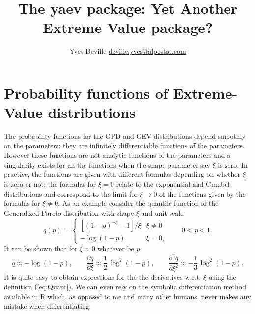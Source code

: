 \documentclass[11pt]{article}\usepackage[]{graphicx}\usepackage[]{xcolor}
\title{\bf \Large The \textbf{yaev} package: Yet Another Extreme Value package?}
\author{Yves Deville \href{mailto:deville.yves@alpestat.com}%
  {deville.yves@alpestat.com} }
\begin{document}
\maketitle{}
\tableofcontents{}

\section{Probability functions of Extreme-Value distributions}
  
The probability functions for the GPD and GEV distributions depend
smoothly on the parameters: they are infinitely differentiable
functions of the parameters. However these functions are not analytic
functions of the parameters and a singularity exists for all the
functions when the shape parameter say $\xi$ is zero.  In practice,
the functions are given with different formulas depending on whether
$\xi$ is zero or not; the formulas for $\xi = 0$ relate to the
exponential and Gumbel distributions and correspond to the limit for
$\xi \to 0$ of the functions given by the formulas for $\xi \neq 0$.
As an example consider the quantile function of the Generalized Pareto
distribution with shape $\xi$ and unit scale
\begin{equation}
\label{eq:Quant}
q(p) = \begin{cases}
  [(1 - p)^{-\xi} - 1] / \xi & \xi \neq 0 \\
  -\log(1 - p) & \xi = 0,
\end{cases} \qquad 0 < p < 1.
\end{equation}
It can be shown that for $\xi \approx 0$ whatever be $p$
$$
q \approx - \log(1-p), \qquad
\frac{\partial q}{\partial \xi} \approx \frac{1}{2}\, \log^2(1-p), \qquad
\frac{\partial^2 q}{\partial \xi^2} \approx -\frac{1}{3}\, \log^2(1-p).
$$
It is quite easy to obtain expressions for the the derivatives
w.r.t. $\xi$ using the definition (\ref{eq:Quant}). We can even rely
on the symbolic differentiation method \verb@D@ available in R which,
as opposed to me and many other humans, never makes any mistake when
differentiating.
\end{document}
